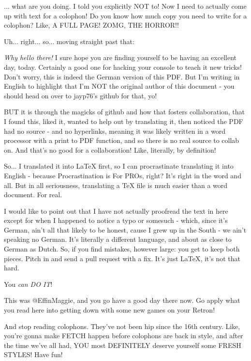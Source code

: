 \documentclass[a4paper]{article}
\begin{document}
\begin{colophon}
... what are you doing. I told you explicitly NOT to! Now I need to actually come up with text for a colophon! Do you know how much copy you need to write for a colophon? Like, A FULL PAGE! ZOMG, THE HORROR!!\footnotemark

Uh... right... so... moving straight past that:

\emph{Why hello there!} I sure hope you are finding yourself to be having an excellent day, today. Certainly a good one for hacking your console to teach it new tricks! Don't worry, this is indeed the German version of this PDF. But I'm writing in English to highlight that I'm NOT the original author of this document - you should head on over to jayp76's github for that, yo!

BUT it is through the magicks of github and how that fosters collaboration, that I found this, liked it, wanted to help out by translating it, then noticed the PDF had no source - and no hyperlinks, meaning it was likely written in a word processor with a print to PDF function, and so there is no real source to collab on. And that's no good for a collaboration! Like, literally, by definition!

So... I translated it into LaTeX first, so I can procrastinate translating it into English - because Procrastination is For PROs, right? It's right in the word and all. But in all seriousness, translating a TeX file is much easier than a word document. For real.

I would like to point out that I have not actually proofread the text in here except for when I happened to notice a typo or somesuch - which, since it's German, ain't all that likely to be honest, cause I grew up in the South - we ain't speaking no German. It's literally a different language, and about as close to German as Dutch. So, if you find mistakes, however large: you get to keep both pieces. Pitch in and send a pull request with a fix. It's just LaTeX, it's not that hard.

You \emph{can DO IT}!

This was @EffinMaggie, and you go have a good day there now. Go apply what you read here into getting down with some new games on your Retron!

And stop reading colophons. They've not been hip since the 16th century. Like, you're gonna make FETCH happen before colophons are back in style, and after the time we've all had, YOU most DEFINITELY deserve yourself some FRESH STYLES! Have fun!

\end{colophon}
\end{document}
